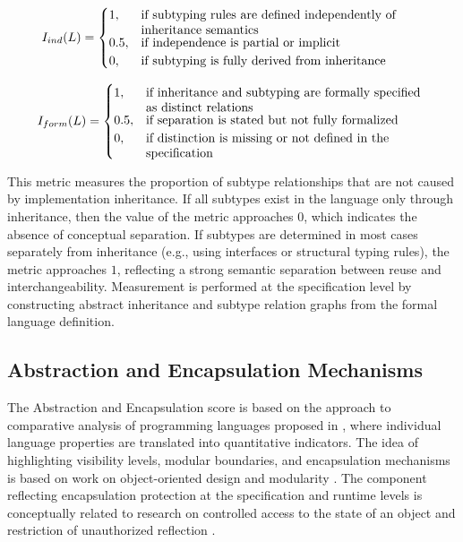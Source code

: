 \[
    I_{ind}(L) =
    \begin{cases}
        1, & \text{\parbox[t]{0.65\linewidth}{\raggedright
            if subtyping rules are defined independently of inheritance semantics%
         }} \\
        0.5, & \text{\parbox[t]{0.65\linewidth}{\raggedright
            if independence is partial or implicit%
         }} \\
        0, & \text{\parbox[t]{0.65\linewidth}{\raggedright
            if subtyping is fully derived from inheritance%
         }}
    \end{cases}
\]

\[
    I_{form}(L) =
    \begin{cases}
        1, & \text{\parbox[t]{0.65\linewidth}{\raggedright
            if inheritance and subtyping are formally specified as distinct relations%
        }} \\
        0.5, & \text{\parbox[t]{0.65\linewidth}{\raggedright
            if separation is stated but not fully formalized%
         }} \\
        0, & \text{\parbox[t]{0.65\linewidth}{\raggedright
            if distinction is missing or not defined in the specification%
         }}
    \end{cases}
\]


This metric measures the proportion of subtype relationships that are not caused by implementation inheritance. If all subtypes exist in the language only through inheritance, then the value of the metric approaches $0$, which indicates the absence of conceptual separation. If subtypes are determined in most cases separately from inheritance (e.g., using interfaces or structural typing rules), the metric approaches $1$, reflecting a strong semantic separation between reuse and interchangeability. Measurement is performed at the specification level by constructing abstract inheritance and subtype relation graphs from the formal language definition. 

\subsection{Abstraction and Encapsulation Mechanisms}

The Abstraction and Encapsulation score is based on the approach to comparative analysis of programming languages proposed in \cite{fayzrakhmanov2022introducing}, where individual language properties are translated into quantitative indicators. The idea of highlighting visibility levels, modular boundaries, and encapsulation mechanisms is based on work on object-oriented design and modularity \cite{meyer1997object, parnas1972criteria}. The component reflecting encapsulation protection at the specification and runtime levels is conceptually related to research on controlled access to the state of an object and restriction of unauthorized reflection \cite{bracha2004mirrors}.

